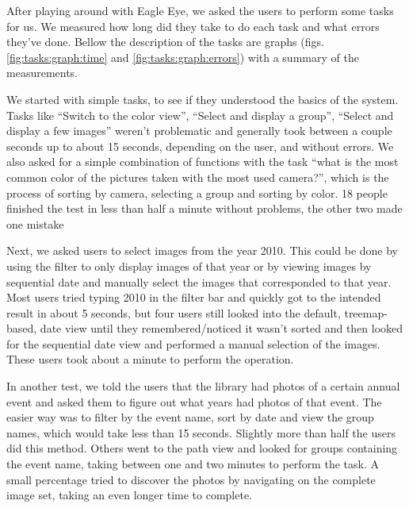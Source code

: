 {After playing around with Eagle Eye, we asked the users to perform some tasks for us. We measured how long did they take to do each task and what errors they've done. Bellow the description of the tasks are graphs (figs. \ref{fig:tasks:graph:time} and \ref{fig:tasks:graph:errors}) with a summary of the measurements.

We started with simple tasks, to see if they understood the basics of the system. Tasks like ``Switch to the color view'', ``Select and display a group'', ``Select and display a few images'' weren't problematic and generally took between a couple seconds up to about 15 seconds, depending on the user, and without errors. We also asked for a simple combination of functions with the task ``what is the most common color of the pictures taken with the most used camera?'', which is the process of sorting by camera, selecting a group and sorting by color. 18 people finished the test in less than half a minute without problems, the other two made one mistake 

Next, we asked users to select images from the year 2010. This could be done by using the filter to only display images of that year or by viewing images by sequential date and manually select the images that corresponded to that year. Most users tried typing 2010 in the filter bar and quickly got to the intended result in about 5 seconds, but four users still looked into the default, treemap-based, date view until they remembered/noticed it wasn't sorted and then looked for the sequential date view and performed a manual selection of the images. These users took about a minute to perform the operation.

In another test, we told the users that the library had photos of a certain annual event and asked them to figure out what years had photos of that event. The easier way was to filter by the event name, sort by date and view the group names, which would take less than 15 seconds. Slightly more than half the users did this method. Others went to the path view and looked for groups containing the event name, taking between one and two minutes to perform the task. A small percentage tried to discover the photos by navigating on the complete image set, taking an even longer time to complete.


}
